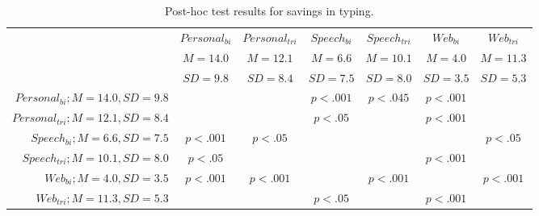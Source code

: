 \documentclass{sigchi}
\begin{document}
\begin{table}
    \centering
    \begin{tabular}{|r|c|c|c|c|c|c|}
    \hline
    ~ & $Personal_{bi}$ & $Personal_{tri}$ & $Speech_{bi}$ & $Speech_{tri}$ & $Web_{bi}$ & $Web_{tri}$ \\
    ~ & $M=14.0$ & $M=12.1$ & $M=6.6$  & $M=10.1$ & $M=4.0$  & $M=11.3$ \\ 
    ~ & $SD=9.8$ & $SD=8.4$ & $SD=7.5$ & $SD=8.0$ & $SD=3.5$ & $SD=5.3$ \\ \hline
    $Personal_{bi};M=14.0,SD=9.8$  & ~                                            & ~                                             & $p<.001$                                  & $p<.045$                                    & $p<.001$                               & ~                                        \\ \hline
    $Personal_{tri};M=12.1,SD=8.4$ & ~                                            & ~                                             & $p<.05$                                   & ~                                           & $p<.001$                               & ~                                        \\ \hline
    $Speech_{bi};M=6.6,SD=7.5$     & $p<.001$                                     & $p<.05$                                       & ~                                         & ~                                           & ~                                      & $p<.05$                                  \\ \hline
    $Speech_{tri};M=10.1,SD=8.0$   & $p<.05$                                      & ~                                             & ~                                         & ~                                           & $p<.001$                               & ~                                        \\ \hline
    $Web_{bi};M=4.0,SD=3.5$        & $p<.001$                                     & $p<.001$                                      & ~                                         & $p<.001$                                    & ~                                      & $p<.001$                                 \\ \hline
    $Web_{tri};M=11.3,SD=5.3$      & ~                                            & ~                                             & $p<.05$                                   & ~                                           & $p<.001$                               & ~                                        \\ \hline
    \end{tabular}
    \caption {Post-hoc test results for savings in typing.}
    \label{tab:savings}
\end{table}
\end{document}
